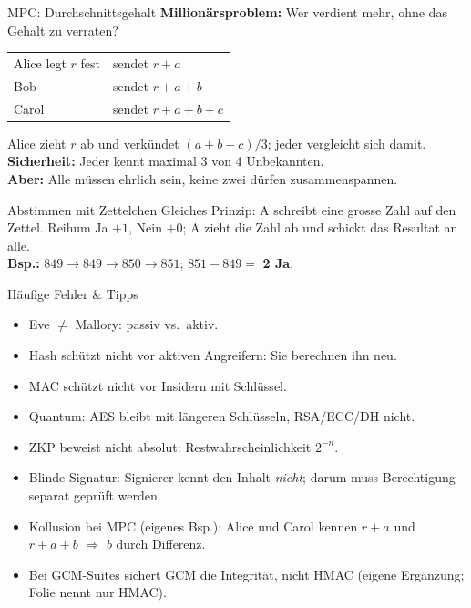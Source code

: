 \documentclass[a4paper, fontsize=7pt]{scrartcl}
\renewcommand*{\arraystretch}{1.5}  %
\begin{document}
\begin{mainbox}{MPC: Durchschnittsgehalt}
\textbf{Millionärsproblem:} Wer verdient mehr, ohne das Gehalt zu verraten?
\renewcommand*{\arraystretch}{1.15}
\begin{center}
\begin{tabular}{l|l}
Alice legt $r$ fest & sendet $r + a$ \\
Bob & sendet $r + a + b$ \\
Carol & sendet $r + a + b + c$ \\
\end{tabular}
\end{center}
Alice zieht $r$ ab und verkündet $(a + b + c)/3$; jeder vergleicht sich damit.\\
\textbf{Sicherheit:} Jeder kennt maximal 3 von 4 Unbekannten.\\
\textbf{Aber:} Alle müssen ehrlich sein, keine zwei dürfen zusammenspannen.
\end{mainbox}

\begin{subbox}{Abstimmen mit Zettelchen}
Gleiches Prinzip: A schreibt eine grosse Zahl auf den Zettel. Reihum Ja $+1$,
Nein $+0$; A zieht die Zahl ab und schickt das Resultat an alle.\\
\textbf{Bsp.:} $849 \to 849 \to 850 \to 851$; $851 - 849 = $ \textbf{2 Ja}.
\end{subbox}

\begin{subbox}{Häufige Fehler \& Tipps}
\begin{itemize}
    \item Eve $\neq$ Mallory: passiv vs.\ aktiv.
    \item Hash schützt nicht vor aktiven Angreifern: Sie berechnen ihn neu.
    \item MAC schützt nicht vor Insidern mit Schlüssel.
    \item Quantum: AES bleibt mit längeren Schlüsseln, RSA/ECC/DH nicht.
    \item ZKP beweist nicht absolut: Restwahrscheinlichkeit $2^{-n}$.
    \item Blinde Signatur: Signierer kennt den Inhalt \emph{nicht}; darum muss
          Berechtigung separat geprüft werden.
    \item Kollusion bei MPC (eigenes Bsp.): Alice und Carol kennen $r + a$ und
          $r + a + b$ $\Rightarrow$ $b$ durch Differenz.
    \item Bei GCM-Suites sichert GCM die Integrität, nicht HMAC (eigene
          Ergänzung; Folie nennt nur HMAC).
\end{itemize}
\end{subbox}
\end{document}
